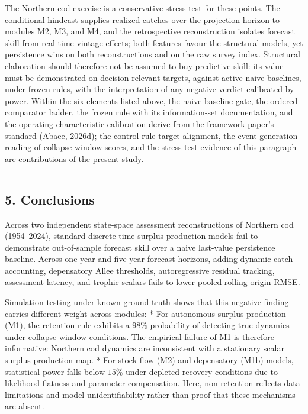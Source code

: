 \documentclass[11pt]{article}
\begin{document}
The Northern cod exercise is a conservative stress test for these
points. The conditional hindcast supplies realized catches over the
projection horizon to modules M2, M3, and M4, and the retrospective
reconstruction isolates forecast skill from real-time vintage effects;
both features favour the structural models, yet persistence wins on both
reconstructions and on the raw survey index. Structural elaboration
should therefore not be assumed to buy predictive skill: its value must
be demonstrated on decision-relevant targets, against active naive
baselines, under frozen rules, with the interpretation of any negative
verdict calibrated by power. Within the six elements listed above, the
naive-baseline gate, the ordered comparator ladder, the frozen rule with
its information-set documentation, and the operating-characteristic
calibration derive from the framework paper's standard (Abaee, 2026d);
the control-rule target alignment, the event-generation reading of
collapse-window scores, and the stress-test evidence of this paragraph
are contributions of the present study.

\begin{center}\rule{0.5\linewidth}{0.5pt}\end{center}

\subsection{5. Conclusions}\label{conclusions}

Across two independent state-space assessment reconstructions of
Northern cod (1954--2024), standard discrete-time surplus-production
models fail to demonstrate out-of-sample forecast skill over a naive
last-value persistence baseline. Across one-year and five-year forecast
horizons, adding dynamic catch accounting, depensatory Allee thresholds,
autoregressive residual tracking, assessment latency, and trophic
scalars fails to lower pooled rolling-origin RMSE.

Simulation testing under known ground truth shows that this negative
finding carries different weight across modules: * For autonomous
surplus production (M1), the retention rule exhibits a \(98\%\)
probability of detecting true dynamics under collapse-window conditions.
The empirical failure of M1 is therefore informative: Northern cod
dynamics are inconsistent with a stationary scalar surplus-production
map. * For stock-flow (M2) and depensatory (M1b) models, statistical
power falls below \(15\%\) under depleted recovery conditions due to
likelihood flatness and parameter compensation. Here, non-retention
reflects data limitations and model unidentifiability rather than proof
that these mechanisms are absent.
\end{document}
